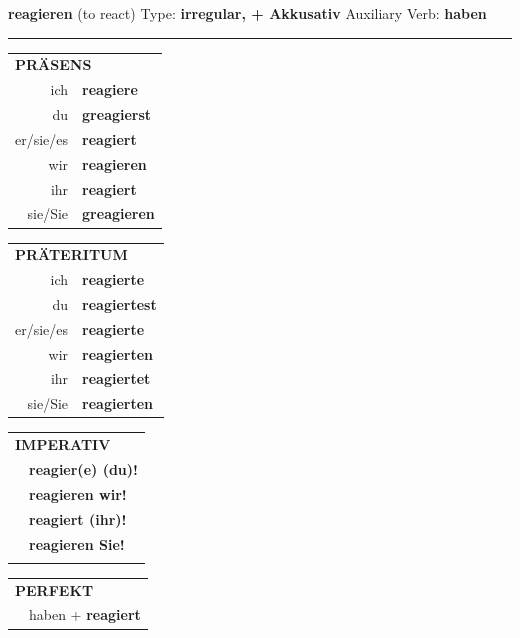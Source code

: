 \documentclass[10pt,a4paper]{revtex4-2}
\begin{document}
\begin{verbbox-acc}
    {\Large \bf reagieren} (to react) \hfill Type: \textbf{irregular, + Akkusativ} \hfill Auxiliary Verb: \textbf{haben} 
    
     \vspace{5pt}

    \hrule
    
    \vspace{5pt}

  \begin{tabular}{rl}
     \multicolumn{2}{l}{\textbf{PRÄSENS} }\\
    ich & \textbf{reagiere}\\
    du & \textbf{greagierst}\\
    er/sie/es & \textbf{reagiert}\\
    wir & \textbf{reagieren}\\
    ihr & \textbf{reagiert}\\
    sie/Sie & \textbf{greagieren}\\
  \end{tabular}
  \hfill
     \begin{tabular}{rl}
    \multicolumn{2}{l}{\textbf{PRÄTERITUM} }\\
    ich & \textbf{reagierte}\\
    du & \textbf{reagiertest}\\
    er/sie/es & \textbf{reagierte}\\
    wir & \textbf{reagierten}\\
    ihr & \textbf{reagiertet}\\
    sie/Sie & \textbf{reagierten}\\
  \end{tabular}
  \hfill
  \begin{tabular}{rl}
     \multicolumn{2}{l}{\textbf{IMPERATIV} }\\
   & \textbf{reagier(e) (du)!}\\
   & \textbf{reagieren wir!}\\
   & \textbf{reagiert (ihr)!}\\
   & \textbf{reagieren Sie!}\\
   & \vspace{10pt}
  \end{tabular}

    \vspace{10pt}

 \begin{tabular}{rl}
     \multicolumn{2}{l}{\textbf{PERFEKT}}\\
  &  haben + \textbf{reagiert}\\
  \end{tabular}
\hfill
   \begin{tabular}{rl}
   

\end{tabular}
\end{verbbox-acc}
\end{document}
